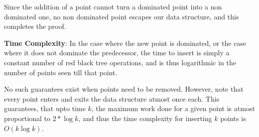 \documentclass{article}
\begin{document}
Since the addition of a point cannot turn a dominated point into a non dominated one, no non dominated point escapes our data structure, and this completes the proof.
\par
\textbf{Time Complexity}:
In the case where the new point is dominated, or the case where it does not dominate the predecessor, the time to insert is simply a constant number of red black tree operations, and is thus logarithmic in the number of points seen till that point.
\par
No such guarantees exist when points need to be removed.
However, note that every point enters and exits the data structure atmost once each. This guarantees, that upto time $k$, the maximum work done for a given point is atmost proportional to $2 * \log{k}$, and thus the time complexity for inserting $k$ points is $O(k \log {k})$.
\end{document}
